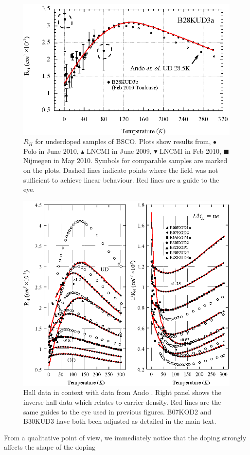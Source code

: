 \begin{figure}[htbp]
	\begin{center}
		\includegraphics[scale=0.9]{Chapter-HallBSCO/Figures/HallIndividual/HallIndividualUD}
		\caption{$R_H$ for underdoped samples of \ac{BSCO}. Plots show results from, $\bullet$ Polo in June 2010, $\blacktriangle$ \ac{LNCMI} in June 2009, $\blacktriangledown$ \ac{LNCMI} in Feb 2010, $\blacksquare$ Nijmegen in May 2010. Symbols for comparable samples are marked on the plots. Dashed lines indicate points where the field was not sufficient to achieve linear behaviour. Red lines are a guide to the eye.}
		\label{Fig:ExpH:HallIndividualUD}
	\end{center}
\end{figure}
\begin{figure}[htbp]
	\begin{center}
		\includegraphics[scale=0.9]{Chapter-HallBSCO/Figures/InvHallCombined/InvHallCombined}
		\caption{Hall data in context with data from Ando \etal\cite{Ando1999}. Right panel shows the inverse hall data which relates to carrier density. Red lines are the same guides to the eye used in previous figures. B07KOD2 and B30KUD3 have both been adjusted as detailed in the main text.}
		\label{Fig:ExpH:InvHallCombined}
	\end{center}
\end{figure}

From a qualitative point of view, we immediately notice that the doping strongly affects the shape of the doping 

